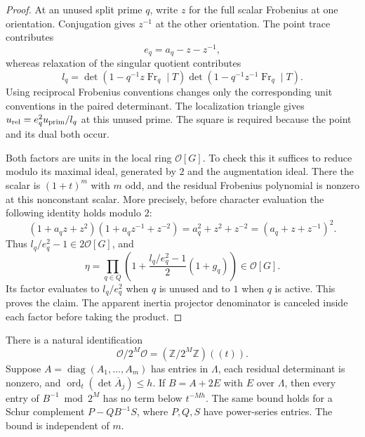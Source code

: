 \begin{proof}
At an unused split prime \(q\), write \(z\) for the
full scalar Frobenius at one orientation.  Conjugation
gives \(z^{-1}\) at the other orientation.  The
point trace contributes
\[
 e_q=a_q-z-z^{-1},
 \]
whereas relaxation of the singular quotient contributes
\begin{equation}
 l_q=
 \det(1-q^{-1}z\operatorname{Fr}_q\mid T)
 \det(1-q^{-1}z^{-1}\operatorname{Fr}_q\mid T).
 \label{rd:unused-factors}
\end{equation}
Using reciprocal Frobenius conventions changes only
the corresponding unit conventions in the paired
determinant.  The localization triangle gives
\(u_{\rm rel}=e_q^2u_{\rm prim}/l_q\) at this
unused prime.  The square is required because the
point and its dual both occur.

Both factors are units in the local ring
\(\mathcal O[G]\).  To check this it suffices to
reduce modulo its maximal ideal, generated by \(2\)
and the augmentation ideal.  There the scalar
is \((1+t)^m\) with \(m\) odd, and the residual
Frobenius polynomial is nonzero at this nonconstant
scalar.  More precisely, before character
evaluation the following identity holds modulo \(2\):
\begin{equation}
 (1+a_qz+z^2)(1+a_qz^{-1}+z^{-2})
       =a_q^2+z^2+z^{-2}
       =(a_q+z+z^{-1})^2 .
 \label{rd:residual-euler}
\end{equation}
Thus \(l_q/e_q^2-1\in2\mathcal O[G]\), and
\begin{equation}
 \eta=
 \prod_{q\in Q}
 \left(1+
       \frac{l_q/e_q^2-1}{2}(1+g_q)\right)
 \in\mathcal O[G].
 \label{rd:eta}
\end{equation}
Its factor evaluates to \(l_q/e_q^2\) when \(q\)
is unused and to \(1\) when \(q\) is active.
This proves the claim.  The apparent inertia
projector denominator is canceled inside each
factor before taking the product.
\end{proof}

\begin{lemma}
\label{rd:schur}
There is a natural identification
\begin{equation}
 \mathcal O/2^M\mathcal O
       =(\mathbb Z/2^M\mathbb Z)((t)).
 \label{rd:laurent}
\end{equation}
Suppose \(A=\operatorname{diag}(A_1,\ldots,A_m)\)
has entries in \(\Lambda\), each residual determinant
is nonzero, and
\(\operatorname{ord}_t(\det\overline A_j)\le h\).
If \(B=A+2E\) with \(E\) over \(\Lambda\), then
every entry of \(B^{-1}\bmod2^M\) has no term below
\(t^{-Mh}\).  The same bound holds for a Schur
complement \(P-QB^{-1}S\), where \(P,Q,S\)
have power-series entries.  The bound is independent
of \(m\).
\end{lemma}

